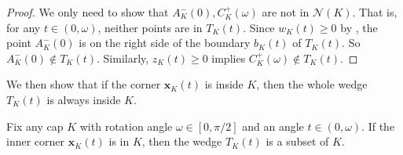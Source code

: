 \begin{proof}
We only need to show that \(A^-_K(0), C^+_K(\omega)\) are not in \(\mathcal{N}(K)\). That is, for any \(t \in (0, \omega)\), neither points are in \(T_K(t)\). Since \(w_K(t) \geq 0\) by , the point \(A_K^-(0)\) is on the right side of the boundary \(b_K(t)\) of \(T_K(t)\). So \(A_K^-(0) \not\in T_K(t)\). Similarly, \(z_K(t) \geq 0\) implies \(C_K^+(\omega) \not\in T_K(t)\).
\end{proof}

We then show that if the corner \(\mathbf{x}_K(t)\) is inside \(K\), then the whole wedge \(T_K(t)\) is always inside \(K\).

\begin{lemma}

Fix any cap \(K\) with rotation angle \(\omega \in [0, \pi/2]\) and an angle \(t \in (0, \omega)\). If the inner corner \(\mathbf{x}_K(t)\) is in \(K\), then the wedge \(T_K(t)\) is a subset of \(K\).

\label{lem:niche-in-cap}
\end{lemma}

